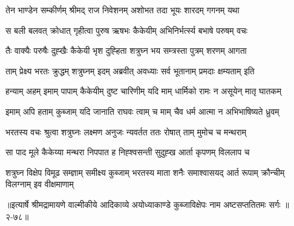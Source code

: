\twolineshloka
{तेन भाण्डेन सम्कीर्णम् श्रीमद् राज निवेशनम्}
{अशोभत तदा भूयः शारदम् गगनम् यथा} %

\twolineshloka
{स बली बलवत् क्रोधात् गृहीत्वा पुरुष ऋषभः}
{कैकेयीम् अभिनिर्भर्त्स्य बभाषे परुषम् वचः} %

\twolineshloka
{तैः वाक्यैः परुषैः दुह्खैः कैकेयी भृश दुह्हिता}
{शत्रुघ्न भय सम्त्रस्ता पुत्रम् शरणम् आगता} %

\twolineshloka
{ताम् प्रेक्ष्य भरतः क्रुद्धम् शत्रुघ्नम् इदम् अब्रवीत्}
{अवध्याः सर्व भूतानाम् प्रमदाः क्षम्यताम् इति} %

\twolineshloka
{हन्याम् अहम् इमाम् पापाम् कैकेयीम् दुष्ट चारिणीम्}
{यदि माम् धार्मिको रामः न असूयेन् मातृ घातकम्} %

\twolineshloka
{इमाम् अपि हताम् कुब्जाम् यदि जानाति राघवः}
{त्वाम् च माम् चैव धर्म आत्मा न अभिभाषिष्यते ध्रुवम्} %

\twolineshloka
{भरतस्य वचः श्रुत्वा शत्रुघ्नः लक्ष्मण अनुजः}
{न्यवर्तत ततः रोषात् ताम् मुमोच च मन्थराम्} %

\twolineshloka
{सा पाद मूले कैकेय्या मन्थरा निपपात ह}
{निह्श्वसन्ती सुदुह्ख आर्ता कृपणम् विललाप च} %

\fourlineindentedshloka
{शत्रुघ्न विक्षेप विमूढ सम्ज्ञाम्}
{समीक्ष्य कुब्जाम् भरतस्य माता}
{शनैः समाश्वासयद् आर्त रूपाम्}
{क्रौन्चीम् विलग्नाम् इव वीक्षमाणाम्} %


॥इत्यार्षे श्रीमद्रामायणे वाल्मीकीये आदिकाव्ये अयोध्याकाण्डे कुब्जाविक्षेपः नाम अष्टसप्ततितमः सर्गः ॥२-७८॥
